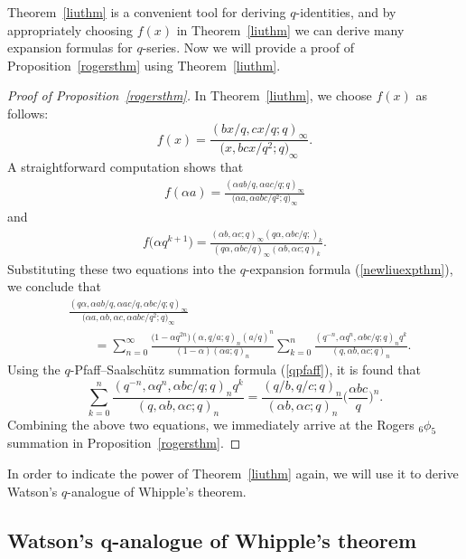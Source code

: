 \documentclass[10pt,a4paper]{amsart}
\numberwithin{equation}{section}
\begin{document}
Theorem~\ref{liuthm} is a convenient tool for deriving $q$-identities, and by appropriately choosing $f(x)$ in Theorem~\ref{liuthm} we can derive many expansion formulas for $q$-series. Now we will provide a proof of Proposition~\ref{rogersthm} using Theorem~\ref{liuthm}.
\begin{proof}[Proof of Proposition~\ref{rogersthm}]
In Theorem~\ref{liuthm}, we choose $f(x)$ as follows:
\[
f(x)=\frac{(bx/q, cx/q; q)_\infty}{\bigl(x, bcx/q^2; q\bigr)_{\infty}}.
\]
A straightforward computation shows that
\begin{align*}
f(\alpha a)=\frac{(\alpha ab/q, \alpha ac/q; q)_\infty}{\bigl(\alpha a, \alpha a bc/q^2; q\bigr)_\infty}
\end{align*}
and
\begin{align*}
f\bigl(\alpha q^{k+1}\bigr)=\frac{(\alpha b, \alpha c; q)_\infty (q\alpha, \alpha bc/q; )_k}{(q\alpha, \alpha bc/q)_\infty (\alpha b, \alpha c; q)_k}.
\end{align*}
Substituting these two equations into the $q$-expansion formula (\ref{newliuexpthm}), we conclude that
{\samepage\begin{align*}	
&\frac{(q\alpha, \alpha ab/q, \alpha ac/q, \alpha bc/q; q)_\infty}
{\bigl(\alpha a, \alpha b, \alpha c, \alpha abc/q^2; q\bigr)_\infty}\\
&\qquad{}=\sum_{n=0}^\infty \frac{\bigl(1-\alpha q^{2n}\bigr)(\alpha, q/a; q)_n (a/q)^n}{(1-\alpha)(\alpha a; q)_n}	
\sum_{k=0}^n \frac{(q^{-n}, \alpha q^n, \alpha bc/q; q)_n q^k}
{(q, \alpha b, \alpha c; q)_n}.
\end{align*}}	
 Using the $q$-Pfaff--Saalsch\"utz summation formula (\ref{qpfaff}), it is found that
\begin{equation*}%
\sum_{k=0}^n \frac{(q^{-n}, \alpha q^n, \alpha bc/q; q)_n q^k}
{(q, \alpha b, \alpha c; q)_n}
=\frac{(q/b, q/c; q)_n}{(\alpha b, \alpha c; q)_n}\biggl(\frac{\alpha bc}{q}\biggr)^n.
\end{equation*}
Combining the above two equations, we immediately arrive at the Rogers $_6\phi_5$ summation in Proposition~\ref{rogersthm}.
\end{proof}

In order to indicate the power of Theorem~\ref{liuthm} again, we will use it to derive Watson's $q$-analogue of Whipple's theorem.

\subsection[Watson's q-analogue of Whipple's theorem]{Watson's $\boldsymbol{q}$-analogue of Whipple's theorem}
\end{document}
